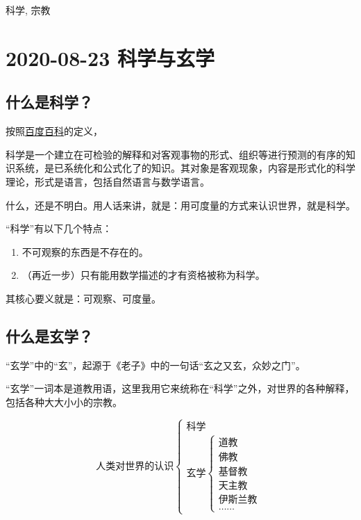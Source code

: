\begin{taged}{科学, 宗教}
\section{2020-08-23 科学与玄学}
\end{taged}

\subsection{什么是科学？}

按照\href{https://baike.baidu.com/item/%E7%A7%91%E5%AD%A6/10406}{百度百科}的定义，

\begin{screen}
    科学是一个建立在可检验的解释和对客观事物的形式、组织等进行预测的有序的知识系统，是已系统化和公式化了的知识。其对象是客观现象，内容是形式化的科学理论，形式是语言，包括自然语言与数学语言。
\end{screen}

什么，还是不明白。用人话来讲，就是：用可度量的方式来认识世界，就是科学。

“科学”有以下几个特点：

\begin{enumerate}[nosep, left=\parindent]
    \item 不可观察的东西是不存在的。
    \item （再近一步）只有能用数学描述的才有资格被称为科学。
\end{enumerate}

其核心要义就是：可观察、可度量。

\subsection{什么是玄学？}

“玄学”中的“玄”，起源于《老子》中的一句话“玄之又玄，众妙之门”。

“玄学”一词本是道教用语，这里我用它来统称在“科学”之外，对世界的各种解释，包括各种大大小小的宗教。

$$
\text{人类对世界的认识}
\begin{cases}
    \text{科学} \\
    \text{玄学}
    \begin{cases}
        \text{道教} \\
        \text{佛教} \\
        \text{基督教} \\
        \text{天主教} \\
        \text{伊斯兰教} \\
        \text{……}
    \end{cases}
\end{cases}
$$

